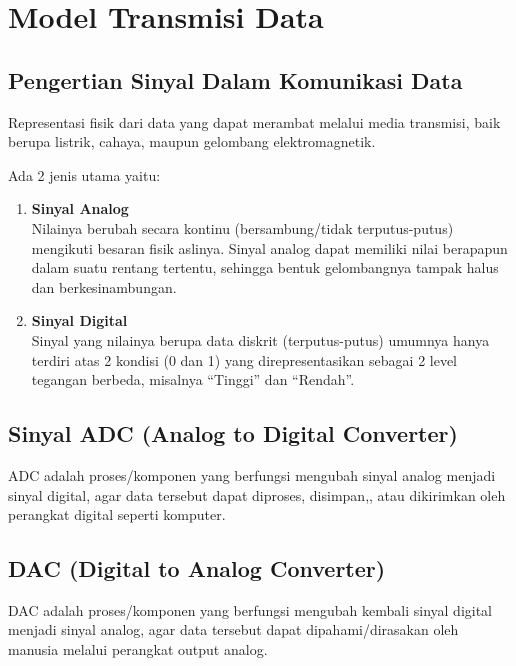\section{Model Transmisi Data}
\subsection{Pengertian Sinyal Dalam Komunikasi Data}
Representasi fisik dari data yang dapat merambat melalui media transmisi, baik berupa listrik, cahaya, maupun gelombang elektromagnetik.


Ada 2 jenis utama yaitu:
\begin{enumerate}
\item \textbf{Sinyal Analog} \\
  Nilainya berubah secara kontinu (bersambung/tidak terputus-putus) mengikuti besaran fisik aslinya. Sinyal analog dapat memiliki nilai berapapun dalam suatu rentang tertentu, sehingga bentuk gelombangnya tampak halus dan berkesinambungan.
\item \textbf{Sinyal Digital} \\
  Sinyal yang nilainya berupa data diskrit (terputus-putus) umumnya hanya terdiri atas 2 kondisi (0 dan 1) yang direpresentasikan sebagai 2 level tegangan berbeda, misalnya ``Tinggi'' dan ``Rendah''.
\end{enumerate}

\subsection{Sinyal ADC (Analog to Digital Converter)}
ADC adalah proses/komponen yang berfungsi mengubah sinyal analog menjadi sinyal digital, agar data tersebut dapat diproses, disimpan,, atau dikirimkan oleh perangkat digital seperti komputer.

\subsection{DAC (Digital to Analog Converter)}
DAC adalah proses/komponen yang berfungsi mengubah kembali sinyal digital menjadi sinyal analog, agar data tersebut dapat dipahami/dirasakan oleh manusia melalui perangkat output analog.

